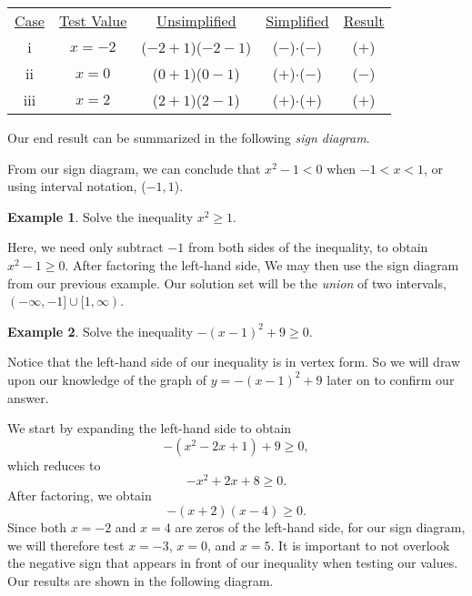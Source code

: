 \documentclass[12pt]{book}
\theoremstyle{definition}
\newtheorem{example}{Example}
\begin{document}
\begin{center}
\begin{tabular}{ccccc}
\underline{Case} & \underline{Test Value} & \underline{Unsimplified} & \underline{Simplified} & \underline{Result}\\
i & $x=-2$ & ($-2+1$)($-2-1$) & ($-$)$\cdot$($-$) & ($+$)\\
ii & $x=0$ & ($0+1$)($0-1$) & ($+$)$\cdot$($-$) & ($-$)\\
iii & $x=2$ & ($2+1$)($2-1$) & ($+$)$\cdot$($+$) & ($+$)
\end{tabular}
\end{center}
Our end result can be summarized in the following {\it sign diagram}.
\begin{center}
\end{center} 
From our sign diagram, we can conclude that $x^2-1<0$ when $-1<x<1$, or using interval notation, ($-1,1$).
\begin{example}
Solve the inequality $x^2\geq 1$.
\end{example}
Here, we need only subtract $-1$ from both sides of the inequality, to obtain $x^2-1\geq 0$.  After factoring the left-hand side, We may then use the sign diagram from our previous example.  Our solution set will be the {\it union} of two intervals, $(-\infty,-1]\cup[1,\infty)$.
\begin{example}
Solve the inequality $-(x-1)^2+9\geq 0$.
\end{example}
Notice that the left-hand side of our inequality is in vertex form.  So we will draw upon our knowledge of the graph of $y=-(x-1)^2+9$ later on to confirm our answer.\par
We start by expanding the left-hand side to obtain $$-(x^2-2x+1)+9\geq 0,$$ which reduces to $$-x^2+2x+8\geq 0.$$  After factoring, we obtain $$-(x+2)(x-4)\geq 0.$$  Since both $x=-2$ and $x=4$ are zeros of the left-hand side, for our sign diagram, we will therefore test $x=-3$, $x=0$, and $x=5$.  It is important to not overlook the negative sign that appears in front of our inequality when testing our values.  Our results are shown in the following diagram.
\end{document}
